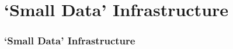 \documentclass[
	aspectratio=169, %
	12pt, %
	t, %
]{beamer}
\begin{document}
\begin{refsegment}
\begin{frame}
    \begin{columns}[t]
        \begin{column}{0.45\textwidth}
            \tableofcontents[sections={1-3}] %
        \end{column}
        \hfill
        \begin{column}{0.45\textwidth}
            \tableofcontents[sections={4-6}] %
        \end{column}
    \end{columns}
\end{frame}


\section{`Small Data' Infrastructure}

\begin{sectionframe} %
	\frametitle{`Small Data' Infrastructure}


\end{sectionframe}





\end{refsegment}
\end{document}
